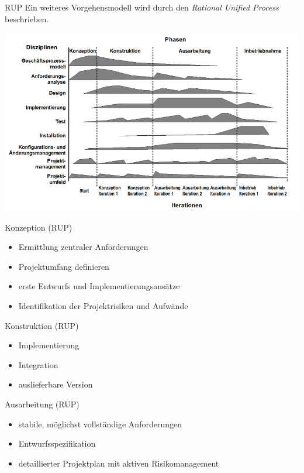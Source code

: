 \begin{defi}{RUP}
    Ein weiteres Vorgehensmodell wird durch den \emph{Rational Unified Process} beschrieben.

    \includegraphics[width=\textwidth]{includes/figures/defi_RUP.png}
\end{defi}

\begin{bonus}{Konzeption (RUP)}
    \begin{itemize}
        \item Ermittlung zentraler Anforderungen
        \item Projektumfang definieren
        \item erste Entwurfs und Implementierungsansätze
        \item Identifikation der Projektrisiken und Aufwände
    \end{itemize}
\end{bonus}

\begin{bonus}{Konstruktion (RUP)}
    \begin{itemize}
        \item Implementierung
        \item Integration
        \item auslieferbare Version
    \end{itemize}
\end{bonus}

\begin{bonus}{Ausarbeitung (RUP)}
    \begin{itemize}
        \item stabile, möglichst vollständige Anforderungen
        \item Entwurfsspezifikation
        \item detaillierter Projektplan mit aktiven Risikomanagement
    \end{itemize}
\end{bonus}

